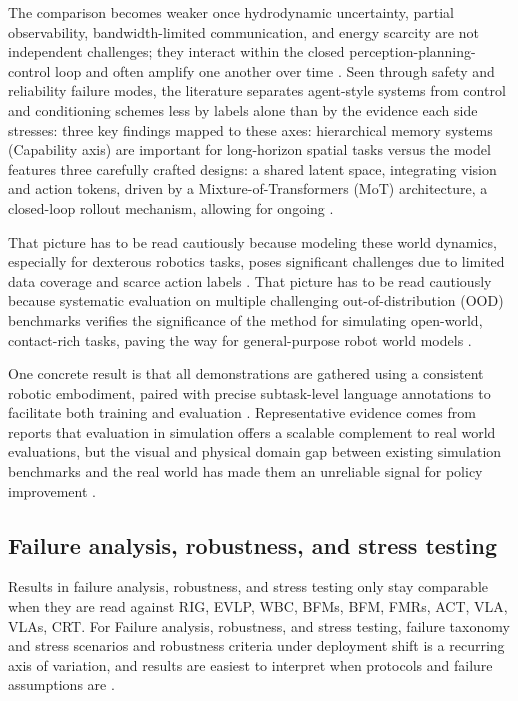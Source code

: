\documentclass[a4paper,11pt]{article}
\begin{document}
The comparison becomes weaker once hydrodynamic uncertainty, partial observability, bandwidth-limited communication, and energy scarcity are not independent challenges; they interact within the closed perception-planning-control loop and often amplify one another over time \citep{Xu2026Underwater}. Seen through safety and reliability failure modes, the literature separates agent-style systems from control and conditioning schemes less by labels alone than by the evidence each side stresses: three key findings mapped to these axes: hierarchical memory systems (Capability axis) are important for long-horizon spatial tasks versus the model features three carefully crafted designs: a shared latent space, integrating vision and action tokens, driven by a Mixture-of-Transformers (MoT) architecture, a closed-loop rollout mechanism, allowing for ongoing \citep{Felicia2026From,Li2026Causal,Brohan2022Robotics}.

That picture has to be read cautiously because modeling these world dynamics, especially for dexterous robotics tasks, poses significant challenges due to limited data coverage and scarce action labels \citep{Gao2026Dreamdojo}. That picture has to be read cautiously because systematic evaluation on multiple challenging out-of-distribution (OOD) benchmarks verifies the significance of the method for simulating open-world, contact-rich tasks, paving the way for general-purpose robot world models \citep{Gao2026Dreamdojo}.

One concrete result is that all demonstrations are gathered using a consistent robotic embodiment, paired with precise subtask-level language annotations to facilitate both training and evaluation \citep{Jiang2025Galaxea}. Representative evidence comes from reports that evaluation in simulation offers a scalable complement to real world evaluations, but the visual and physical domain gap between existing simulation benchmarks and the real world has made them an unreliable signal for policy improvement \citep{Jain2025Polaris}.

\subsection{Failure analysis, robustness, and stress testing}


Results in failure analysis, robustness, and stress testing only stay comparable when they are read against RIG, EVLP, WBC, BFMs, BFM, FMRs, ACT, VLA, VLAs, CRT. For Failure analysis, robustness, and stress testing, failure taxonomy and stress scenarios and robustness criteria under deployment shift is a recurring axis of variation, and results are easiest to interpret when protocols and failure assumptions are \citep{Hundt2022Robots,Jain2025Polaris,Jiang2025Behavior,Jiang2025Galaxea}.
\end{document}
